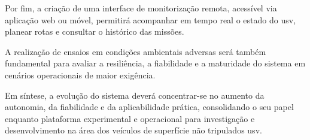 Por fim, a criação de uma interface de monitorização remota, acessível via aplicação web ou móvel, permitirá acompanhar em tempo real o estado do \gls{usv}, planear rotas e consultar o histórico das missões.  

A realização de ensaios em condições ambientais adversas será também fundamental para avaliar a resiliência, a fiabilidade e a maturidade do sistema em cenários operacionais de maior exigência.  

Em síntese, a evolução do sistema deverá concentrar-se no aumento da autonomia, da fiabilidade e da aplicabilidade prática, consolidando o seu papel enquanto plataforma experimental e operacional para investigação e desenvolvimento na área dos veículos de superfície não tripulados \gls{usv}.
